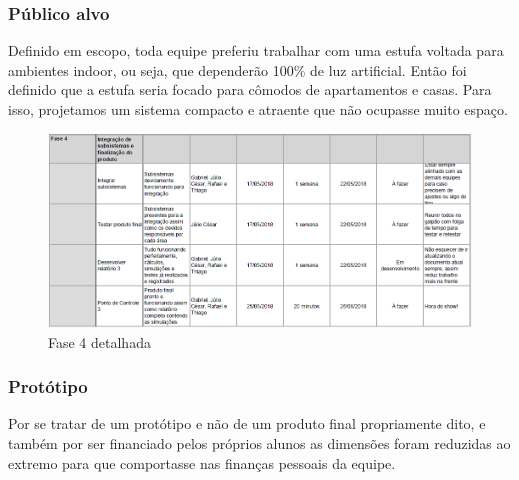 \subsubsection{Público alvo}

Definido em escopo, toda equipe preferiu trabalhar com uma estufa voltada para ambientes indoor, ou seja, que dependerão 100\% de luz artificial. Então foi definido que a estufa seria focado para cômodos de apartamentos e casas. Para isso, projetamos um sistema compacto e atraente que não ocupasse muito espaço.

\begin{figure}[H]
	\centering
	\includegraphics[width=17cm]{figuras/fase_4.png}
	\caption{Fase 4 detalhada} 
	\label{fase_4}
\end{figure}

\subsubsection{Protótipo}

Por se tratar de um protótipo e não de um produto final propriamente dito, e também por ser financiado pelos próprios alunos as dimensões foram reduzidas ao extremo para que comportasse nas finanças pessoais da equipe.

